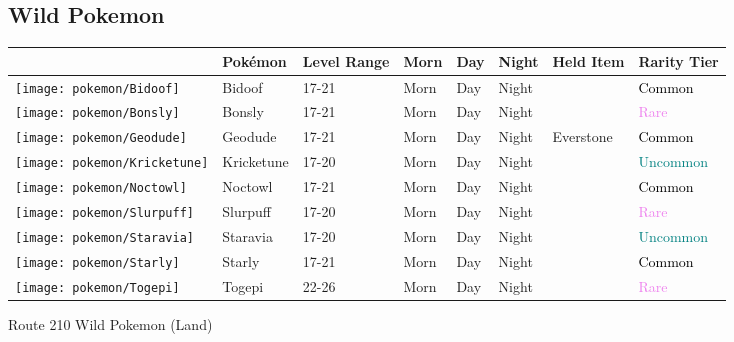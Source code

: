 \subsection{Wild Pokemon}%
\label{subsec:WildPokemon}%
\begin{longtable}{||l l l l l l l l||}%
\hline%
&Pokémon&Level Range&Morn&Day&Night&Held Item&Rarity Tier\\%
\hline%
\endhead%
\hline%
\texttt{[image: pokemon/Bidoof]}&Bidoof&17{-}21&Morn&Day&Night&&\textcolor{black}{%
Common%
}\\%
\hline%
\texttt{[image: pokemon/Bonsly]}&Bonsly&17{-}21&Morn&Day&Night&&\textcolor{violet}{%
Rare%
}\\%
\hline%
\texttt{[image: pokemon/Geodude]}&Geodude&17{-}21&Morn&Day&Night&Everstone&\textcolor{black}{%
Common%
}\\%
\hline%
\texttt{[image: pokemon/Kricketune]}&Kricketune&17{-}20&Morn&Day&Night&&\textcolor{teal}{%
Uncommon%
}\\%
\hline%
\texttt{[image: pokemon/Noctowl]}&Noctowl&17{-}21&Morn&Day&Night&&\textcolor{black}{%
Common%
}\\%
\hline%
\texttt{[image: pokemon/Slurpuff]}&Slurpuff&17{-}20&Morn&Day&Night&&\textcolor{violet}{%
Rare%
}\\%
\hline%
\texttt{[image: pokemon/Staravia]}&Staravia&17{-}20&Morn&Day&Night&&\textcolor{teal}{%
Uncommon%
}\\%
\hline%
\texttt{[image: pokemon/Starly]}&Starly&17{-}21&Morn&Day&Night&&\textcolor{black}{%
Common%
}\\%
\hline%
\texttt{[image: pokemon/Togepi]}&Togepi&22{-}26&Morn&Day&Night&&\textcolor{violet}{%
Rare%
}\\%
\hline%
\end{longtable}%
\caption{Route 210 Wild Pokemon (Land)}